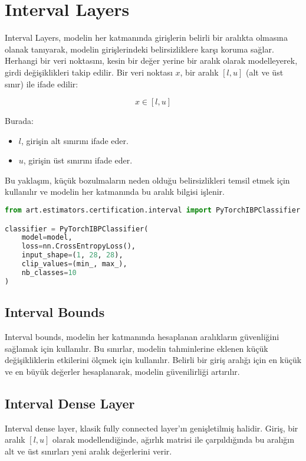\section{Interval Layers}

Interval Layers, modelin her katmanında girişlerin belirli bir aralıkta olmasına olanak tanıyarak, modelin girişlerindeki belirsizliklere karşı koruma sağlar. Herhangi bir veri noktasını, kesin bir değer yerine bir aralık olarak modelleyerek, girdi değişiklikleri takip edilir. Bir veri noktası $x$, bir aralık $[l,u]$ (alt ve üst sınır) ile ifade edilir:

\[ x \in [l, u] \]

Burada:

\begin{itemize}
    \item $l$, girişin alt sınırını ifade eder.
    \item $u$, girişin üst sınırını ifade eder.
\end{itemize}

Bu yaklaşım, küçük bozulmaların neden olduğu belirsizlikleri temsil etmek için kullanılır ve modelin her katmanında bu aralık bilgisi işlenir.

\begin{lstlisting}[language=Python]
from art.estimators.certification.interval import PyTorchIBPClassifier

classifier = PyTorchIBPClassifier(
    model=model,
    loss=nn.CrossEntropyLoss(),
    input_shape=(1, 28, 28),
    clip_values=(min_, max_),
    nb_classes=10
)
\end{lstlisting}

\subsection{Interval Bounds}

Interval bounds, modelin her katmanında hesaplanan aralıkların güvenliğini sağlamak için kullanılır. Bu sınırlar, modelin tahminlerine eklenen küçük değişikliklerin etkilerini ölçmek için kullanılır. Belirli bir giriş aralığı için en küçük ve en büyük değerler hesaplanarak, modelin güvenilirliği artırılır.

\subsection{Interval Dense Layer}

Interval dense layer, klasik fully connected layer'ın genişletilmiş halidir. Giriş, bir aralık $[l, u]$ olarak modellendiğinde, ağırlık matrisi ile çarpıldığında bu aralığın alt ve üst sınırları yeni aralık değerlerini verir.

